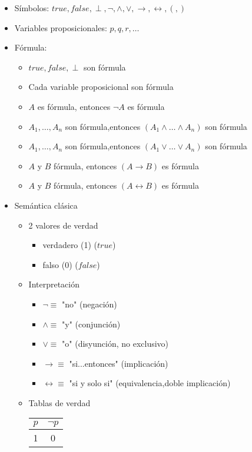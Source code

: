 \documentclass[a4paper,10pt]{article}
\begin{document}
	\begin{itemize}
		\item Símbolos: $true,false,\perp,\neg,\wedge,\vee,\rightarrow,\leftrightarrow,(,)$
		\item Variables proposicionales: $p,q,r,\dots$
		\item Fórmula: 
		\begin{itemize}	
			\item $true,false,\perp$ son fórmula
			\item Cada variable proposicional son fórmula
			\item $A$ es fórmula, entonces $\neg A$ es fórmula
			\item $A_1,\dots,A_n$ son fórmula,entonces $(A_1 \wedge \dots \wedge A_n)$ son fórmula
			\item $A_1,\dots,A_n$ son fórmula,entonces $(A_1 \vee \dots \vee A_n)$ son fórmula
			\item $A$ y $B$ fórmula, entonces $(A \rightarrow B)$ es fórmula
			\item $A$ y $B$ fórmula, entonces $(A \leftrightarrow B)$ es fórmula
		\end{itemize}
		\item Semántica clásica
		\begin{itemize}
			\item 2 valores de verdad
			\begin{itemize}
				\item verdadero (1) ($true$)
				\item falso (0) ($false$)
			\end{itemize}
			\item Interpretación
			\begin{itemize}
				\item $\neg \equiv$ "no" (negación)
				\item $\wedge \equiv$ "y" (conjunción)
				\item $\vee \equiv$ "o" (disyunción, no exclusivo)
				\item $\rightarrow \equiv$ "si...entonces" (implicación)
				\item $\leftrightarrow \equiv$ "si y solo si" (equivalencia,doble implicación) 
			\end{itemize}
			\item Tablas de verdad
			\begin{center}
				\begin{tabular}{| l | c | }
     				\hline
     				$p$ & $\neg p$  \\ \hline
     				1 & 0  \\ \hline

\end{tabular}
\end{center}
\end{itemize}
\end{itemize}
\end{document}
